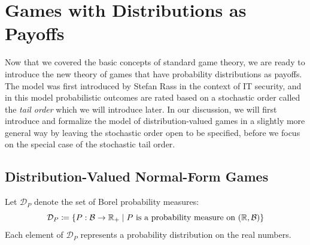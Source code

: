\documentclass[a4paper]{scrreprt}
\newcommand{\Rp}{\mathbb{R}_+}
\newcommand{\B}{\mathcal{B}}
\newcommand{\D}{\mathcal{D}}
\begin{document}
    
    
    
    \chapter{Games with Distributions as Payoffs}
    Now that we covered the basic concepts of standard game theory, we are ready to introduce the new theory of games that have probability distributions as payoffs.
    The model was first introduced by Stefan Rass %
    in the context of IT security, and in this model probabilistic outcomes are rated based on a stochastic order called the \emph{tail order} which we will introduce later.
    In our discussion, we will first introduce and formalize the model of distribution-valued games in a slightly more general way by leaving the stochastic order open to be specified, before we focus on the special case of the stochastic tail order.
    
    \section{Distribution-Valued Normal-Form Games}
    \label{sec:distributionValuedNormalFormGames}
    \newcommand{\DP}{\D_P} %
    
    Let $\DP$ denote the set of Borel probability measures:
    \[ \DP \coloneqq \set{P: \B \to \Rp \mid P \text{ is a probability measure on } (\R, \B)} \]
    Each element of $\DP$ represents a probability distribution on the real numbers.
    
    \let\dleq\preccurlyeq
    \let\dgeq\succcurlyeq
    \let\dless\prec
    \let\dgreater\succ
    
    \newcommand{\leqE}{\dleq_E}
    \newcommand{\leqst}{\dleq_{\text{st}}}
    \newcommand{\leqtail}{\dleq_{\text{tail}}}
    \newcommand{\lesstail}{\dless_{\text{tail}}}
    \newcommand{\greatertail}{\dgreater_{\text{tail}}}
    \newcommand{\leqRlex}{\leq_{\textsc{Rlex}}}
    \newcommand{\lessRlex}{<_{\textsc{Rlex}}}
    \newcommand{\geqRlex}{\geq_{\textsc{Rlex}}}
    \newcommand{\greaterRlex}{>_{\textsc{Rlex}}}
    
\end{document}
